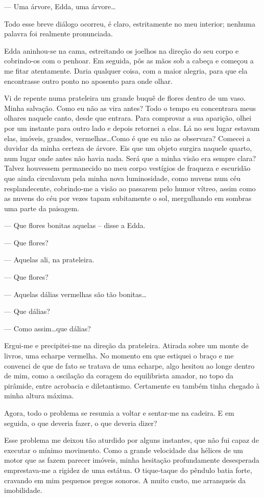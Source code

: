 --- Uma árvore, Edda, uma árvore\dots

Todo esse breve diálogo ocorreu, é claro, estritamente no meu interior; nenhuma palavra foi realmente pronunciada.

Edda aninhou-se na cama, estreitando os joelhos na direção do seu corpo e cobrindo-os com o penhoar. Em seguida, pôs as mãos sob a cabeça e começou a me fitar atentamente. Daria qualquer coisa, com a maior alegria, para que ela encontrasse outro ponto no aposento para onde olhar.

Vi de repente numa prateleira um grande buquê de flores dentro de um vaso. Minha salvação.
Como eu não as vira antes? Todo o tempo eu concentrara meus olhares naquele canto, desde que entrara. Para comprovar a sua aparição, olhei por um instante para outro lado e depois retornei a elas. Lá no seu lugar estavam elas, imóveis, grandes, vermelhas\dots Como é que eu não as observara? Comecei a duvidar da minha certeza de árvore. Eis que um objeto surgira naquele quarto, num lugar onde antes não havia nada. Será que a minha visão era sempre clara? Talvez houvessem permanecido no meu corpo vestígios de fraqueza e escuridão que ainda circulavam pela minha nova luminosidade, como nuvens num céu resplandecente, cobrindo-me a visão ao passarem pelo humor vítreo, assim como as nuvens do céu por vezes tapam subitamente o sol, mergulhando em sombras uma parte da paisagem.

--- Que flores bonitas aquelas -- disse a Edda.

--- Que flores?

--- Aquelas ali, na prateleira.

--- Que flores?

--- Aquelas dálias vermelhas são tão bonitas\dots

--- Que dálias?

--- Como assim\dots que dálias?

Ergui-me e precipitei-me na direção da prateleira. Atirada sobre um monte de livros, uma echarpe vermelha. No momento em que estiquei o braço e me convenci de que de fato se tratava de uma echarpe, algo hesitou ao longe dentro de mim, como a oscilação da coragem do equilibrista amador, no topo da pirâmide, entre acrobacia e diletantismo. Certamente eu também tinha chegado à minha altura máxima.

Agora, todo o problema se resumia a voltar e sentar-me na cadeira. E em seguida, o que deveria fazer, o que deveria dizer?

Esse problema me deixou tão aturdido por alguns instantes, que não fui capaz de executar o mínimo movimento. Como a grande velocidade das hélices de um motor que as fazem parecer imóveis, minha hesitação profundamente desesperada emprestava-me a rigidez de uma estátua. O tique-taque do pêndulo batia forte, cravando em mim pequenos pregos sonoros. A muito custo, me arranqueis da imobilidade. 

